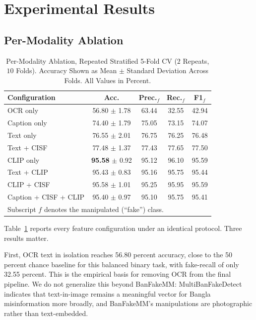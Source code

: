 \documentclass[conference,a4paper]{IEEEtran}
\begin{document}
\section{Experimental Results}

\subsection{Per-Modality Ablation}
\label{sec:ablation}

\begin{table}[t]
\caption{Per-Modality Ablation, Repeated Stratified 5-Fold CV
($2$ Repeats, $10$ Folds). Accuracy Shown as Mean $\pm$ Standard Deviation
Across Folds. All Values in Percent.}
\label{tab:ablation}
\centering
\setlength{\tabcolsep}{3.5pt}
\begin{tabular}{lcccc}
\toprule
\textbf{Configuration} & \textbf{Acc.} & \textbf{Prec.$_{f}$} &
\textbf{Rec.$_{f}$} & \textbf{F1$_{f}$} \\
\midrule
OCR only              & 56.80 $\pm$ 1.78 & 63.44 & 32.55 & 42.94 \\
Caption only          & 74.40 $\pm$ 1.79 & 75.05 & 73.15 & 74.07 \\
Text only             & 76.55 $\pm$ 2.01 & 76.75 & 76.25 & 76.48 \\
Text + CISF           & 77.48 $\pm$ 1.37 & 77.43 & 77.65 & 77.50 \\
\midrule
CLIP only             & \textbf{95.58} $\pm$ 0.92 & 95.12 & 96.10 & 95.59 \\
Text + CLIP           & 95.43 $\pm$ 0.83 & 95.16 & 95.75 & 95.44 \\
CLIP + CISF           & 95.58 $\pm$ 1.01 & 95.25 & 95.95 & 95.59 \\
Caption + CISF + CLIP & 95.40 $\pm$ 0.97 & 95.10 & 95.75 & 95.41 \\
\bottomrule
\multicolumn{5}{l}{\footnotesize Subscript $f$ denotes the manipulated
(``fake'') class.}
\end{tabular}
\end{table}

Table~\ref{tab:ablation} reports every feature configuration under an
identical protocol. Three results matter.

First, OCR text in isolation reaches 56.80 percent accuracy, close to the
50 percent chance baseline for this balanced binary task, with fake-recall of
only 32.55 percent. This is the empirical basis for removing OCR from the
final pipeline. We do not generalize this beyond BanFakeMM: MultiBanFakeDetect
\cite{multibanfake} indicates that text-in-image remains a meaningful vector
for Bangla misinformation more broadly, and BanFakeMM's manipulations are
photographic rather than text-embedded.
\end{document}
